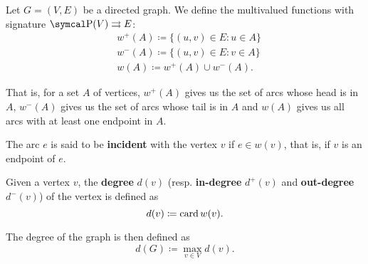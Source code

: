\begin{definition}\label{def:graph_incidence}
  Let \( G = (V, E) \) be a directed graph. We define the multivalued functions with signature \( \Power(V) \MultTo E \):
  \begin{align*}
    &w^+(A) \coloneqq \{ (u, v) \in E \colon u \in A \} \\
    &w^-(A) \coloneqq \{ (u, v) \in E \colon v \in A \} \\
    &w(A) \coloneqq w^+(A) \cup w^-(A).
  \end{align*}

  That is, for a set \( A \) of vertices, \( w^+(A) \) gives us the set of arcs whose head is in \( A \), \( w^-(A) \) gives us the set of arcs whose tail is in \( A \) and \( w(A) \) gives us all arcs with at least one endpoint in \( A \).

  \begin{defenum}
     The arc \( e \) is said to be \textbf{incident} with the vertex \( v \) if \( e \in w(v) \), that is, if \( v \) is an endpoint of \( e \).

    \cite[chapter 1, section 1.4]{Gondran1984} Given a vertex \( v \), the \textbf{degree} \( d(v) \) (resp. \textbf{in-degree} \( d^+(v) \) and \textbf{out-degree} \( d^-(v) \)) of the vertex is defined as
    \begin{equation*}
      d(v) \coloneqq \operatorname{card} w(v).
    \end{equation*}

    The degree of the graph is then defined as
    \begin{equation*}
      d(G) \coloneqq \max_{v \in V} d(v).
    \end{equation*}
  \end{defenum}
\end{definition}

